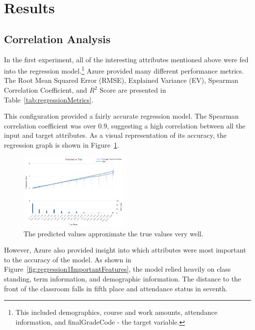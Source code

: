\section{Results} 

\subsection{Correlation Analysis}
In the first experiment, all of the interesting attributes mentioned above were fed into the regression model.\footnote{This included demographics, course and work amounts, attendance information, and finalGradeCode - the target variable.} Azure provided many different performance metrics. The Root Mean Squared Error (RMSE), Explained Variance (EV), Spearman Correlation Coefficient, and $R^2$ Score are presented in Table~\ref{tab:regressionMetrics}.

This configuration provided a fairly accurate regression model. The Spearman correlation coefficient was over $0.9$, suggesting a high correlation between all the input and target attributes. As a visual representation of its accuracy, the regression graph is shown in Figure~\ref{fig:regression1Graph}.

\begin{figure}[ht]
  \centering
	\includegraphics[width=0.48\textwidth]{figures/regression1Graph.png}
	\caption{The predicted values approximate the true values very well.}
	\label{fig:regression1Graph}
\end{figure}

However, Azure also provided insight into which attributes were most important to the accuracy of the model. As shown in Figure~\ref{fig:regression1ImportantFeatures}, the model relied heavily on class standing, term information, and demographic information. The distance to the front of the classroom falls in fifth place and attendance status in seventh.

